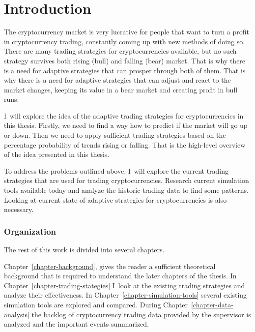 
\chapter{Introduction}

The cryptocurrency market is very lucrative for people that want to turn a profit in cryptocurrency trading, constantly coming up with new methods of doing so. There are many trading strategies for cryptocurrencies available, but no such strategy survives both rising (bull) and falling (bear) market. That is why there is a need for adaptive strategies that can prosper through both of them. That is why there is a need for adaptive strategies that can adjust and react to the market changes, keeping its value in a bear market and creating profit in bull runs.

I~will explore the idea of the adaptive trading strategies for cryptocurrencies in this thesis. Firstly, we need to find a way how to predict if the market will go up or down. Then we need to apply sufficient trading strategies based on the percentage probability of trends rising or falling. That is the high-level overview of the idea presented in this thesis.

To address the problems outlined above, I~will explore the current trading strategies that are used for trading cryptocurrencies. Research current simulation tools available today and analyze the historic trading data to find some patterns. Looking at current state of adaptive strategies for cryptocurrencies is also necessary.


\subsection*{Organization}

The rest of this work is divided into several chapters.

Chapter~\ref{chapter-background}, gives the reader a sufficient theoretical background that is required to understand the later chapters of the thesis. In Chapter~\ref{chapter-trading-stategies} I~look at the existing trading strategies and analyze their effectiveness. In Chapter~\ref{chapter-simulation-tools} several existing simulation tools are explored and compared. During Chapter~\ref{chapter-data-analysis} the backlog of cryptocurrency trading data provided by the supervisor is analyzed and the important events summarized.

